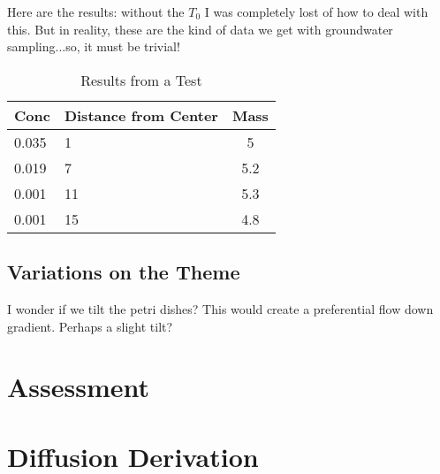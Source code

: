 \documentclass{article}
\begin{document}
Here are the results: without the $T_0$ I was completely lost of how to deal with this. But in reality, these are the kind of data we get with groundwater sampling...so, it must be trivial!


\begin{table}
	\begin{tabular}{llc} \hline
Conc		&		Distance from Center	&	Mass \\ \hline\hline
0.035		& 	1				& 5		\\
0.019		&		7				& 5.2 \\
0.001		& 	11			&	5.3	\\
0.001	  & 	15			&	4.8	\\ \hline
	\end{tabular}
	\caption{Results from a Test}
	\label{tab:ResultsFromATest}
\end{table}

\subsection{Variations on the Theme}

I wonder if we tilt the petri dishes?  This would create a preferential flow down gradient. Perhaps a slight tilt?





\section{Assessment}


\section{Diffusion Derivation}
\end{document}
